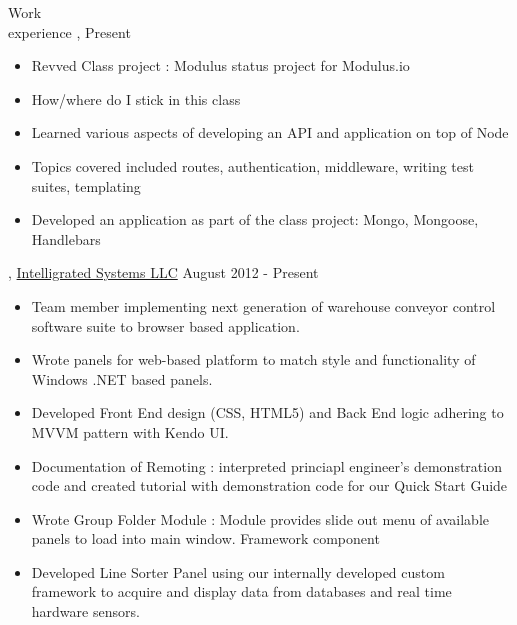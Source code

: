 \begin{category}{Work \\experience}
, Present
\begin{itemize}
\item Revved Class project : Modulus status project for Modulus.io 
\item How/where do I stick in this class
\item Learned various aspects of developing an API and application on top of Node
\item Topics covered included routes, authentication, middleware, writing test suites, templating
\item Developed an application as part of the class project: Mongo, Mongoose, Handlebars
\end{itemize}

, \href{http://www.intelligrated.com}{Intelligrated Systems LLC} August 2012 - Present
\begin{itemize}
\item Team member implementing next generation of warehouse conveyor control software suite to browser based application.
\item Wrote panels for web-based platform to match style and functionality of Windows .NET based panels. %
\item Developed Front End design (CSS, HTML5) and Back End logic adhering to MVVM pattern with Kendo UI. %
\item Documentation of Remoting : interpreted princiapl engineer's demonstration code and created tutorial with demonstration code for our Quick Start Guide %
\item Wrote Group Folder Module : Module provides slide out menu of available panels to load into main window. Framework component


\item Developed Line Sorter Panel using our internally developed custom framework to acquire and display data from databases and real time hardware sensors.


\end{itemize}
\end{category}

